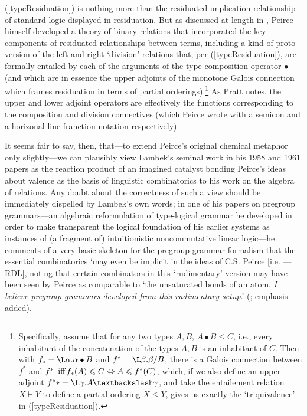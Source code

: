 \documentclass[output=paper,colorlinks,citecolor=brown]{langscibook}
\begin{document}
\noindent
(\ref{typeResiduation}) is nothing more than the residuated implication
relationship of standard logic displayed in residuation.  But as
discussed at length in \citet{pratt92}, Peirce himself developed a theory of
binary relations that incorporated the key components of residuated
relationships between terms, including a kind of proto-version of the
left and right `division' relations that, per (\ref{typeResiduation}), are
formally entailed by each of the arguments of the type composition
operator $\bullet$ (and which are in essence the upper adjoints of the
monotone Galois connection which frames residuation in terms of
partial orderings).\footnote{Specifically, assume that for any two
types $A,B$, $A\bullet B \leqslant C$, i.e., every inhabitant of the
concatenation of the types $A, B$ is an inhabitant of $C$. Then with
$f_\ast = \L\alpha. \alpha\bullet B$ and $f^\ast = \L \beta. \beta/B$,
there is a Galois connection between $f^\ast$ and $f^\ast \textrm{\,
iff\,} f_\ast(A) \leqslant C \Leftrightarrow A\leqslant f^\ast(C)$,
which, if we also define an upper adjoint $f^\ast\ast = \L
\gamma. A\bsl\gamma$, and take the entailement relation $X\vdash
Y$ to define a partial ordering $X\leqslant Y$, gives us exactly the
`triquivalence' in (\ref{typeResiduation}).} As Pratt notes, the upper and
lower adjoint operators are effectively the functions corresponding to
the composition and division connectives (which Peirce wrote with a
semicon and a horizonal-line franction notation respectively).

It seems fair to say, then, that---to extend Peirce's original
chemical metaphor only slightly---we can plausibly view Lambek's
seminal work in his 1958 and 1961 papers as the reaction product of an
imagined catalyst bonding Peirce's ideas about valence as the basis of
linguistic combinatorics to his work on the algebra of relations. Any
doubt about the correctness of such a view should be immediately
dispelled by Lambek's own words; in one of his papers on pregroup
grammars---an algebraic reformulation of type-logical grammar he
developed in order to make transparent the logical foundation of his
earlier systems as instances of (a fragment of) intuitionistic
noncommutative linear logic---he comments of a very basic skeleton for
the pregroup grammar formalism that the essential combinatorics `may
even be implicit in the ideas of C.S. Peirce [i.e. \citet{peirce1897}
---RDL], noting that certain combinators in this `rudimentary' version
may have been seen by Peirce as comparable to `the unsaturated bonds
of an atom. \textsl{I believe pregroup grammars developed from this
rudimentary setup}.' (\citealt[352]{lambek2007a}; emphasis added).
\end{document}
